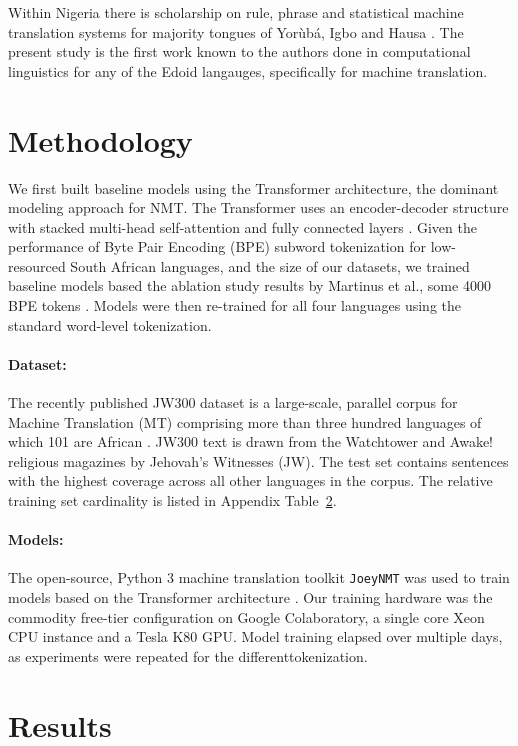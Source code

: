 \documentclass{article} %
\begin{document}
Within Nigeria there is scholarship on rule, phrase and statistical machine translation systems for majority tongues of Yor{\`u}b{\'a}, Igbo and Hausa \citep{odojelanguage}. The present study is the first work known to the authors done in computational linguistics for any of the Edoid langauges, specifically for machine translation.


\section{Methodology}
\label{methods}

We first built baseline models using the Transformer architecture, the dominant modeling approach for NMT. The Transformer uses an encoder-decoder structure with stacked multi-head self-attention and fully connected layers \citep{NIPS2017_7181}. Given the performance of Byte Pair Encoding (BPE) subword tokenization for low-resourced South African languages, and the size of our datasets, we trained baseline models based the ablation study results by Martinus et al., some 4000 BPE tokens \citep{focus_southafrica}. Models were then re-trained for all four languages using the standard word-level tokenization.

\paragraph{Dataset:} The recently published JW300 dataset is a large-scale, parallel corpus for Machine Translation (MT) comprising more than three hundred languages of which 101 are African \citep{agic-vulic-2019-jw300}. JW300 text is drawn from the Watchtower and Awake! religious magazines by Jehovah's Witnesses (JW). The test set contains sentences with the highest coverage across all other languages in the corpus. The relative training set cardinality is listed in Appendix Table~\ref{results}. 

\paragraph{Models:} The open-source, Python 3 machine translation toolkit \texttt{JoeyNMT} was used to train models based on the Transformer architecture \citep{JoeyNMT}. Our training hardware was the commodity free-tier configuration on Google Colaboratory, a single core Xeon CPU instance and a Tesla K80 GPU. Model training elapsed over multiple days, as experiments were repeated for the differenttokenization.

\section{Results}
\label{results}
\end{document}
